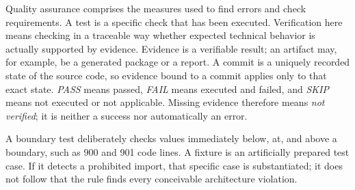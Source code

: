 \begin{beginnerstatement}

Quality assurance comprises the measures used to find errors and check
requirements. A test is a specific check that has been executed. Verification
here means checking in a traceable way whether expected technical behavior is
actually supported by evidence. Evidence is a verifiable result; an artifact
may, for example, be a generated package or a report. A commit is a uniquely
recorded state of the source code, so evidence bound to a commit applies only
to that exact state. \emph{PASS} means passed, \emph{FAIL} means executed and
failed, and \emph{SKIP} means not executed or not applicable. Missing evidence
therefore means \emph{not verified}; it is neither a success nor automatically
an error.

A boundary test deliberately checks values immediately below, at, and above a
boundary, such as 900 and 901 code lines. A fixture is an artificially prepared
test case. If it detects a prohibited import, that specific case is
substantiated; it does not follow that the rule finds every conceivable
architecture violation.

\end{beginnerstatement}
